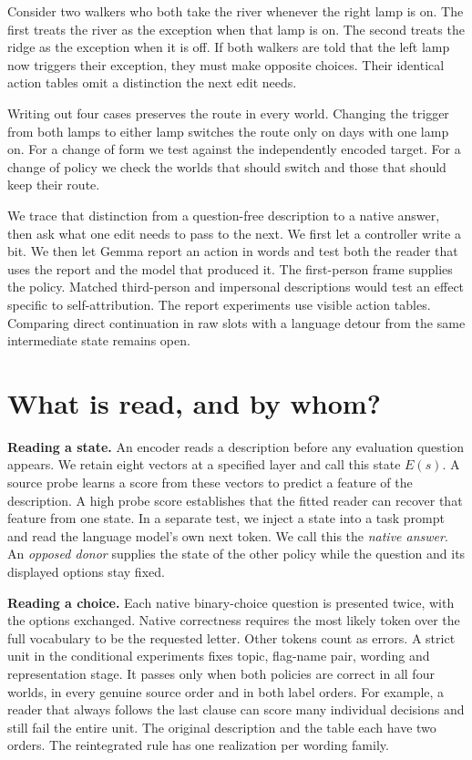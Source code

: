 \documentclass[11pt]{article}
\begin{document}
Consider two walkers who both take the river whenever the right lamp is on. The first treats the river as the exception when that lamp is on. The second treats the ridge as the exception when it is off. If both walkers are told that the left lamp now triggers their exception, they must make opposite choices. Their identical action tables omit a distinction the next edit needs.

Writing out four cases preserves the route in every world. Changing the trigger from both lamps to either lamp switches the route only on days with one lamp on. For a change of form we test against the independently encoded target. For a change of policy we check the worlds that should switch and those that should keep their route.

We trace that distinction from a question-free description to a native answer, then ask what one edit needs to pass to the next. We first let a controller write a bit. We then let Gemma report an action in words and test both the reader that uses the report and the model that produced it. The first-person frame supplies the policy. Matched third-person and impersonal descriptions would test an effect specific to self-attribution. The report experiments use visible action tables. Comparing direct continuation in raw slots with a language detour from the same intermediate state remains open.

\section{What is read, and by whom?}

\textbf{Reading a state.} An encoder reads a description before any evaluation question appears. We retain eight vectors at a specified layer and call this state $E(s)$. A source probe learns a score from these vectors to predict a feature of the description. A high probe score establishes that the fitted reader can recover that feature from one state. In a separate test, we inject a state into a task prompt and read the language model's own next token. We call this the \emph{native answer}. An \emph{opposed donor} supplies the state of the other policy while the question and its displayed options stay fixed.

\textbf{Reading a choice.} Each native binary-choice question is presented twice, with the options exchanged. Native correctness requires the most likely token over the full vocabulary to be the requested letter. Other tokens count as errors. A strict unit in the conditional experiments fixes topic, flag-name pair, wording and representation stage. It passes only when both policies are correct in all four worlds, in every genuine source order and in both label orders. For example, a reader that always follows the last clause can score many individual decisions and still fail the entire unit. The original description and the table each have two orders. The reintegrated rule has one realization per wording family.
\end{document}
